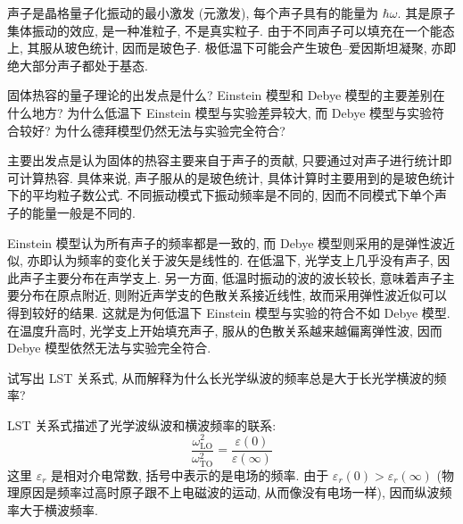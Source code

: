 \documentclass[UTF8]{ctexart}
\newenvironment{Answer}{}{}
\begin{document}
\begin{Question}
\begin{Answer}
    \begin{Solve}[Solve:]
        \hspace*{2em}声子是晶格量子化振动的最小激发 (元激发), 每个声子具有的能量为 $\hbar \omega$. 其是原子集体振动的效应, 是一种准粒子, 不是真实粒子. 由于不同声子可以填充在一个能态上, 其服从玻色统计, 因而是玻色子. 极低温下可能会产生玻色--爱因斯坦凝聚, 亦即绝大部分声子都处于基态.
    \end{Solve}
\end{Answer}

            \item 固体热容的量子理论的出发点是什么? Einstein 模型和 Debye 模型的主要差别在什么地方? 为什么低温下 Einstein 模型与实验差异较大, 而 Debye 模型与实验符合较好? 为什么德拜模型仍然无法与实验完全符合?

\begin{Answer}
    \begin{Solve}[Solve:]
        \hspace*{2em}主要出发点是认为固体的热容主要来自于声子的贡献, 只要通过对声子进行统计即可计算热容. 具体来说, 声子服从的是玻色统计, 具体计算时主要用到的是玻色统计下的平均粒子数公式. 不同振动模式下振动频率是不同的, 因而不同模式下单个声子的能量一般是不同的. 

        \hspace*{2em}Einstein 模型认为所有声子的频率都是一致的, 而 Debye 模型则采用的是弹性波近似, 亦即认为频率的变化关于波矢是线性的. 在低温下, 光学支上几乎没有声子, 因此声子主要分布在声学支上. 另一方面, 低温时振动的波的波长较长, 意味着声子主要分布在原点附近, 则附近声学支的色散关系接近线性, 故而采用弹性波近似可以得到较好的结果. 这就是为何低温下 Einstein 模型与实验的符合不如 Debye 模型. 在温度升高时, 光学支上开始填充声子, 服从的色散关系越来越偏离弹性波, 因而 Debye 模型依然无法与实验完全符合.
    \end{Solve}
\end{Answer}

            \item 试写出 LST 关系式, 从而解释为什么长光学纵波的频率总是大于长光学横波的频率?

\begin{Answer}
    \begin{Solve}[Solve:]
        \hspace*{2em}LST 关系式描述了光学波纵波和横波频率的联系:
            \begin{equation}
                \dfrac{\omega^{2}_{\mathrm{LO}}}{\omega^{2}_{\mathrm{TO}}} = \dfrac{\varepsilon(0)}{\varepsilon(\infty)}
            \end{equation}
        这里 $\varepsilon_{r}$ 是相对介电常数, 括号中表示的是电场的频率. 由于 $\varepsilon_r(0) > \varepsilon_r(\infty)$ (物理原因是频率过高时原子跟不上电磁波的运动, 从而像没有电场一样), 因而纵波频率大于横波频率.
    \end{Solve}
\end{Answer}


\end{Question}
\end{document}
